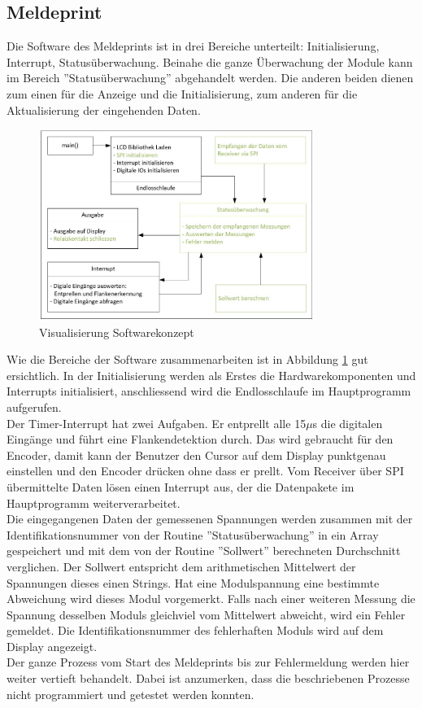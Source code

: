 \subsection{Meldeprint}
Die Software des Meldeprints ist in drei Bereiche unterteilt: Initialisierung, Interrupt, Statusüberwachung. Beinahe die ganze Überwachung der Module kann im Bereich ''Statusüberwachung'' abgehandelt werden. Die anderen beiden dienen zum einen für die Anzeige und die Initialisierung, zum anderen für die Aktualisierung der eingehenden Daten.

\begin{figure}[htbp] 
  \centering
     \includegraphics[width=0.8\textwidth]{graphics/reportboard-software-river}
  \caption{Visualisierung Softwarekonzept}
  \label{fig:reportboard-software-river}
\end{figure}

Wie die Bereiche der Software zusammenarbeiten ist in Abbildung \ref{fig:reportboard-software-river} gut ersichtlich. In der Initialisierung werden als Erstes die Hardwarekomponenten  und Interrupts initialisiert, anschliessend wird die Endlosschlaufe im Hauptprogramm aufgerufen.\\
Der Timer-Interrupt hat zwei Aufgaben. Er entprellt alle 15$\mu$s die digitalen Eingänge und führt eine Flankendetektion durch. Das wird gebraucht für den Encoder, damit kann der Benutzer den Cursor auf dem Display punktgenau einstellen und den Encoder drücken ohne dass er prellt. Vom Receiver über SPI übermittelte Daten lösen einen Interrupt aus, der die Datenpakete im Hauptprogramm weiterverarbeitet.\\
Die eingegangenen Daten der gemessenen Spannungen werden zusammen mit der Identifikationsnummer von der Routine ''Statusüberwachung'' in ein Array gespeichert und mit dem von der Routine ''Sollwert'' berechneten Durchschnitt verglichen. Der Sollwert entspricht dem arithmetischen Mittelwert der Spannungen dieses einen Strings. Hat eine Modulspannung eine bestimmte Abweichung wird dieses Modul vorgemerkt. Falls nach einer weiteren Messung die Spannung desselben Moduls gleichviel vom Mittelwert abweicht, wird ein Fehler gemeldet. Die Identifikationsnummer des fehlerhaften Moduls wird auf dem Display angezeigt.\\
Der ganze Prozess vom Start des Meldeprints bis zur Fehlermeldung werden hier weiter vertieft behandelt. Dabei ist anzumerken, dass die beschriebenen Prozesse nicht programmiert und getestet werden konnten.
